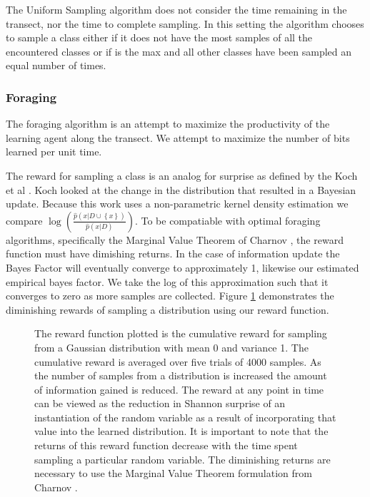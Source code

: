 The Uniform Sampling algorithm does not consider the time remaining in the
transect, nor the time to complete sampling.  In this setting the algorithm
chooses to sample a class either if it does not have the most samples of all
the encountered classes or if is the max and all other classes have been
sampled an equal number of times.

\subsubsection{Foraging}

The foraging algorithm is an attempt to maximize the productivity of the learning agent along the transect.  We attempt to maximize the number of bits learned per unit time.

The reward for sampling a class is an analog for surprise as
defined by the Koch et al \cite{itti2009bayesian}.  Koch looked at the change
in the distribution that resulted in a Bayesian update.  Because this work
uses a non-parametric kernel density estimation we compare
$\log\left(\frac{\hat{p}(x|D\cup \left\{x\right\})}{\hat{p}(x|D)}\right)$.  To
be compatiable with optimal foraging algorithms, specifically the Marginal
Value Theorem of Charnov \cite{charnov1973optimal}, the reward function must
have dimishing returns.  In the case of information update the Bayes Factor
will eventually converge to approximately 1, likewise our estimated empirical
bayes factor.  We take the log of this approximation such that it converges to
zero as more samples are collected.  Figure \ref{fig:reward} demonstrates the diminishing rewards of sampling a distribution using our reward function.



\begin{figure}[htpd!]
	\centering
	\def\svgwidth{\columnwidth}
	
	\caption{The reward function plotted is the cumulative reward for sampling from a Gaussian distribution with mean 0 and variance 1.  The cumulative reward is averaged over five trials of 4000 samples.  As the number of samples from a distribution is increased the amount of information gained is reduced.  The reward at any point in time can be viewed as the reduction in Shannon surprise of an instantiation of the random variable as a result of incorporating that value into the learned distribution.  It is important to note that the returns of this reward function decrease with the time spent sampling a particular random variable.  The diminishing returns are necessary to use the Marginal Value Theorem formulation from Charnov \cite{charnov1973optimal}.}
	\label{fig:reward}
\end{figure}

